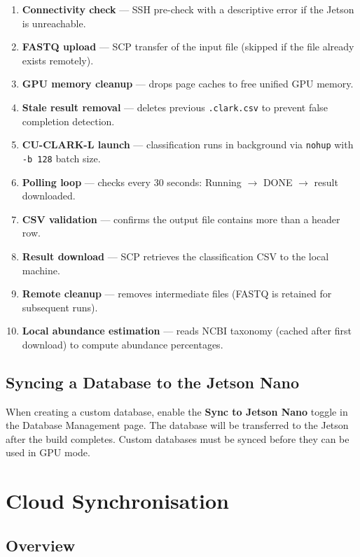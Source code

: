 \documentclass[12pt,a4paper]{report}
\begin{document}
\begin{enumerate}[leftmargin=1.5em]
  \item \textbf{Connectivity check} — SSH pre-check with a descriptive error if the Jetson is unreachable.
  \item \textbf{FASTQ upload} — SCP transfer of the input file (skipped if the file already exists remotely).
  \item \textbf{GPU memory cleanup} — drops page caches to free unified GPU memory.
  \item \textbf{Stale result removal} — deletes previous \texttt{.clark.csv} to prevent false completion detection.
  \item \textbf{CU-CLARK-L launch} — classification runs in background via \texttt{nohup} with \texttt{-b 128} batch size.
  \item \textbf{Polling loop} — checks every 30 seconds: Running $\to$ DONE $\to$ result downloaded.
  \item \textbf{CSV validation} — confirms the output file contains more than a header row.
  \item \textbf{Result download} — SCP retrieves the classification CSV to the local machine.
  \item \textbf{Remote cleanup} — removes intermediate files (FASTQ is retained for subsequent runs).
  \item \textbf{Local abundance estimation} — reads NCBI taxonomy (cached after first download) to compute abundance percentages.
\end{enumerate}

\section{Syncing a Database to the Jetson Nano}

When creating a custom database, enable the \textbf{Sync to Jetson Nano} toggle in the Database Management page. The database will be transferred to the Jetson after the build completes. Custom databases must be synced before they can be used in GPU mode.

\chapter{Cloud Synchronisation}

\section{Overview}
\end{document}
